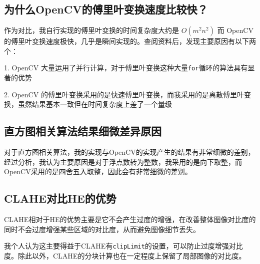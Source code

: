 \documentclass{article}
\begin{document}
\subsection{为什么OpenCV的傅里叶变换速度比较快？}

作为对比，我自行实现的傅里叶变换的时间复杂度大约是 $O(m^2n^2)$ 而 OpenCV 的傅里叶变换速度极快，几乎是瞬间实现的。查阅资料后，发现主要原因有以下两个：

1. OpenCV 大量运用了并行计算，对于傅里叶变换这种大量\texttt{for}循环的算法具有显著的优势

2. OpenCV 的傅里叶变换采用的是快速傅里叶变换，而我采用的是离散傅里叶变换，虽然结果基本一致但在时间复杂度上差了一个量级

\subsection{直方图相关算法结果细微差异原因}

对于直方图相关算法，我的实现与OpenCV的实现产生的结果有非常细微的差别，经过分析，我认为主要原因是对于浮点数转为整数，我采用的是向下取整，而OpenCV采用的是四舍五入取整，因此会有非常细微的差别。


\subsection{CLAHE对比HE的优势}

CLAHE相对于HE的优势主要是它不会产生过度的增强，在改善整体图像对比度的同时不会过度增强某些区域的对比度，从而避免图像细节丢失。

我个人认为这主要得益于CLAHE有\texttt{clipLimit}的设置，可以防止过度增强对比度。除此以外，CLAHE的分块计算也在一定程度上保留了局部图像的对比度。
\end{document}
